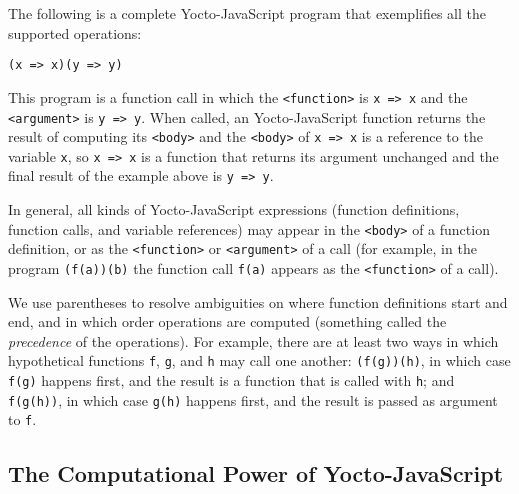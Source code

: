 \documentclass[12pt, oneside]{book}
\begin{document}
The following is a complete Yocto-JavaScript program that exemplifies all the supported operations:

\begin{verbatim}
(x => x)(y => y)
\end{verbatim}

This program is a function call in which the \verb!<function>! is \texttt{x => x} and the \verb!<argument>! is \texttt{y => y}. When called, an Yocto-JavaScript function returns the result of computing its \verb!<body>! and the \verb!<body>! of \texttt{x => x} is a reference to the variable \texttt{x}, so \texttt{x => x} is a function that returns its argument unchanged and the final result of the example above is \texttt{y => y}.

In general, all kinds of Yocto-JavaScript expressions (function definitions, function calls, and variable references) may appear in the \verb!<body>! of a function definition, or as the \verb!<function>! or \verb!<argument>! of a call (for example, in the program \texttt{(f(a))(b)} the function call \texttt{f(a)} appears as the \verb!<function>! of a call).

We use parentheses to resolve ambiguities on where function definitions start and end, and in which order operations are computed (something called the \emph{precedence} of the operations). For example, there are at least two ways in which hypothetical functions \texttt{f}, \texttt{g}, and \texttt{h} may call one another: \texttt{(f(g))(h)}, in which case \texttt{f(g)} happens first, and the result is a function that is called with \texttt{h}; and \texttt{f(g(h))}, in which case \texttt{g(h)} happens first, and the result is passed as argument to \texttt{f}.

\subsection{The Computational Power of Yocto-JavaScript}
\label{The Computational Power of Yocto-JavaScript}
\end{document}
